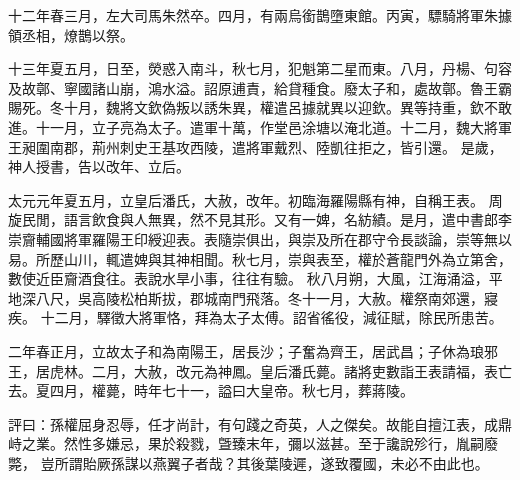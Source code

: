 \begin{pinyinscope}
 
十二年春三月，左大司馬朱然卒。四月，有兩烏銜鵲墮東館。丙寅，驃騎將軍朱據領丞相，燎鵲以祭。
 
 
十三年夏五月，日至，熒惑入南斗，秋七月，犯魁第二星而東。八月，丹楊、句容及故鄣、寧國諸山崩，鴻水溢。詔原逋責，給貸種食。廢太子和，處故鄣。魯王霸賜死。冬十月，魏將文欽偽叛以誘朱異，權遣呂據就異以迎欽。異等持重，欽不敢進。十一月，立子亮為太子。遣軍十萬，作堂邑涂塘以淹北道。十二月，魏大將軍王昶圍南郡，荊州刺史王基攻西陵，遣將軍戴烈、陸凱往拒之，皆引還。
 是歲，神人授書，告以改年、立后。
 
 
太元元年夏五月，立皇后潘氏，大赦，改年。初臨海羅陽縣有神，自稱王表。
 周旋民閒，語言飲食與人無異，然不見其形。又有一婢，名紡績。是月，遣中書郎李崇齎輔國將軍羅陽王印綬迎表。表隨崇俱出，與崇及所在郡守令長談論，崇等無以易。所歷山川，輒遣婢與其神相聞。秋七月，崇與表至，權於蒼龍門外為立第舍，數使近臣齎酒食往。表說水旱小事，往往有驗。
 秋八月朔，大風，江海涌溢，平地深八尺，吳高陵松柏斯拔，郡城南門飛落。冬十一月，大赦。權祭南郊還，寢疾。
 十二月，驛徵大將軍恪，拜為太子太傅。詔省徭役，減征賦，除民所患苦。
 
 
二年春正月，立故太子和為南陽王，居長沙；子奮為齊王，居武昌；子休為琅邪王，居虎林。二月，大赦，改元為神鳳。皇后潘氏薨。諸將吏數詣王表請福，表亡去。夏四月，權薨，時年七十一，謚曰大皇帝。秋七月，葬蔣陵。
 
 
評曰：孫權屈身忍辱，任才尚計，有句踐之奇英，人之傑矣。故能自擅江表，成鼎峙之業。然性多嫌忌，果於殺戮，曁臻末年，彌以滋甚。至于讒說殄行，胤嗣廢斃，
 豈所謂貽厥孫謀以燕翼子者哉？其後葉陵遲，遂致覆國，未必不由此也。
 
 
\end{pinyinscope}